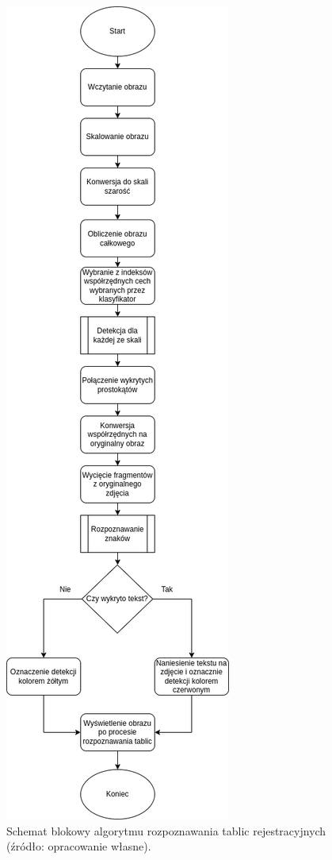 \begin{figure}[!ht]
    \centering
    \includegraphics[scale=0.4]{Pictures/main_alg}
    \caption{Schemat blokowy algorytmu rozpoznawania tablic rejestracyjnych (źródło: opracowanie własne).}
    \label{fig:main_alg}
\end{figure}
\FloatBarrier

